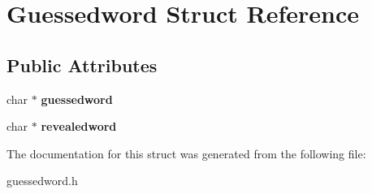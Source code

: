 \hypertarget{structGuessedword}{\section{Guessedword Struct Reference}
\label{structGuessedword}
}
\subsection*{Public Attributes}
\begin{DoxyCompactItemize}
\item 
\hypertarget{structGuessedword_abcf4aa0bb9a7353ca2d55cb63ef68f2c}{char $\ast$ {\bfseries guessedword}}\label{structGuessedword_abcf4aa0bb9a7353ca2d55cb63ef68f2c}

\item 
\hypertarget{structGuessedword_aa212ff9f266895640319ad9f908ddb8b}{char $\ast$ {\bfseries revealedword}}\label{structGuessedword_aa212ff9f266895640319ad9f908ddb8b}

\end{DoxyCompactItemize}


The documentation for this struct was generated from the following file\-:\begin{DoxyCompactItemize}
\item 
guessedword.\-h\end{DoxyCompactItemize}
